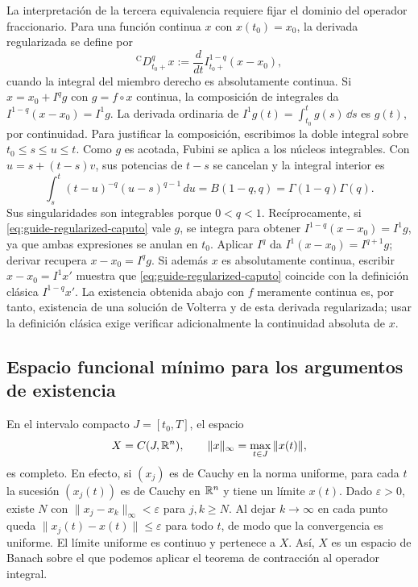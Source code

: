 La interpretación de la tercera equivalencia requiere fijar el dominio
del operador fraccionario. Para una función continua $x$ con $x(t_0)=x_0$,
la derivada regularizada se define por
\begin{equation}
 {}^{\mathrm C}D_{t_0+}^{q}x
 :=\frac{d}{dt}I_{t_0+}^{1-q}(x-x_0),
 \label{eq:guide-regularized-caputo}
\end{equation}
cuando la integral del miembro derecho es absolutamente continua.
Si $x=x_0+I^qg$ con $g=f\circ x$ continua, la composición de integrales
da \(I^{1-q}(x-x_0)=I^1g\). La derivada ordinaria de
\(I^1g(t)=\int_{t_0}^tg(s)\,\dd s\) es \(g(t)\), por continuidad.
Para justificar la composición, escribimos la doble integral sobre
\(t_0\le s\le u\le t\). Como \(g\) es acotada, Fubini se aplica a
los núcleos integrables. Con \(u=s+(t-s)v\), sus potencias de \(t-s\)
se cancelan y la integral interior es
\[
 \int_s^t(t-u)^{-q}(u-s)^{q-1}\,du
 =B(1-q,q)=\Gamma(1-q)\Gamma(q).
\]
Sus singularidades son integrables porque $0<q<1$. Recíprocamente, si
\cref{eq:guide-regularized-caputo} vale $g$, se integra para obtener
$I^{1-q}(x-x_0)=I^1g$, ya que ambas expresiones se anulan en $t_0$.
Aplicar $I^q$ da $I^1(x-x_0)=I^{q+1}g$; derivar recupera
$x-x_0=I^qg$. Si además $x$ es absolutamente continua, escribir
$x-x_0=I^1x'$ muestra que
\cref{eq:guide-regularized-caputo} coincide con la definición clásica
$I^{1-q}x'$. La existencia obtenida abajo con $f$ meramente continua
es, por tanto, existencia de una solución de Volterra y de esta derivada
regularizada; usar la definición clásica exige verificar adicionalmente
la continuidad absoluta de $x$.

\subsection{Espacio funcional mínimo para los argumentos de existencia}

En el intervalo compacto \(J=[t_0,T]\), el espacio
\begin{equation}
 X=C(J,\mathbb{R}^n),\qquad
 \|x\|_\infty=\max_{t\in J}\|x(t)\|,
 \label{eq:guide-sup-norm}
\end{equation}
es completo. En efecto, si \((x_j)\) es de Cauchy en la norma uniforme,
para cada \(t\) la sucesión \((x_j(t))\) es de Cauchy en \(\mathbb{R}^n\) y
tiene un límite \(x(t)\). Dado \(\varepsilon>0\), existe \(N\) con
\(\|x_j-x_k\|_\infty<\varepsilon\) para \(j,k\ge N\). Al dejar
\(k\to\infty\) en cada punto queda
\(\|x_j(t)-x(t)\|\le\varepsilon\) para todo \(t\), de modo que la
convergencia es uniforme. El límite uniforme es continuo y pertenece a
\(X\). Así, \(X\) es un espacio de Banach sobre el que podemos aplicar
el teorema de contracción al operador integral.

